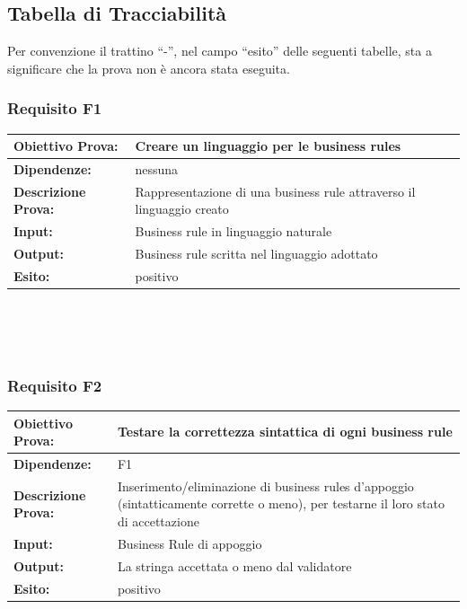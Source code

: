 \documentclass[11pt,titlepage,a4paper]{report}
\begin{document}
\subsection{Tabella di Tracciabilit\`a}
Per convenzione il trattino ``-'', nel campo ``esito'' delle seguenti tabelle, sta a significare che la prova non \`e ancora stata eseguita. \newline
\subsubsection{Requisito F1}
\begin{tabular}{||p{4.5cm}||p{7.5cm}||}
\hline
{\textbf {Obiettivo Prova:}}& Creare un linguaggio per le business rules \\ \hline
{\textbf{Dipendenze:}}& nessuna \\ \hline
{\textbf{Descrizione Prova:}}& Rappresentazione di una business rule attraverso il linguaggio creato \\ \hline
{\textbf{Input:}}&  Business rule in linguaggio naturale \\ \hline
{\textbf{Output:}}& Business rule scritta nel linguaggio adottato \\ \hline
{\textbf{Esito:}}& positivo\\ \hline
\end{tabular} \\
\\
\\
\subsubsection{Requisito F2}
\begin{tabular}{||p{4.5cm}||p{7.5cm}||}
\hline
{\textbf {Obiettivo Prova:}}& Testare la correttezza sintattica di ogni business rule \\ \hline
{\textbf{Dipendenze:}}& F1 \\ \hline
{\textbf{Descrizione Prova:}}& Inserimento/eliminazione di business rules d'appoggio (sintatticamente corrette o meno), per testarne il loro stato di accettazione \\ \hline
{\textbf{Input:}}& Business Rule di appoggio \\ \hline
{\textbf{Output:}}& La stringa accettata o meno dal validatore \\ \hline
{\textbf{Esito:}}& positivo\\ \hline
\end{tabular} \\
\\
\\
\end{document}
